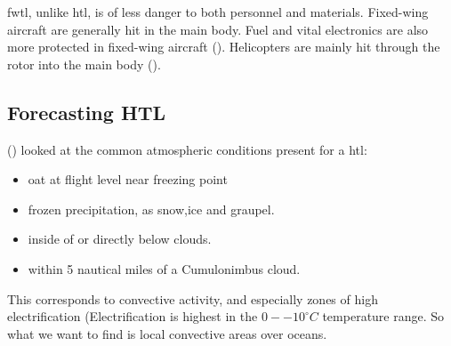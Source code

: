\acrfull{fwtl}, unlike \acrshort{htl}, is of less danger to both personnel and materials. Fixed-wing aircraft are generally hit in the main body. Fuel and vital electronics are also more protected in fixed-wing aircraft (\cite{Petrov12}). Helicopters are mainly hit through the rotor into the main body (\cite{lande}). 


\subsection{Forecasting HTL}
(\cite{lande}) looked at the common atmospheric conditions present for a \acrshort{htl}:
\begin{itemize}
 \item \acrfull{oat} at flight level near freezing point 
 \item frozen precipitation, as snow,ice and graupel.
 \item inside of or directly below clouds.
 \item within 5 nautical miles of a Cumulonimbus cloud.
\end{itemize}
This corresponds to convective activity, and especially zones of high electrification (Electrification is highest in the $0 - -10^{\circ}C$ temperature range. So what we want to find is local convective areas over oceans.



